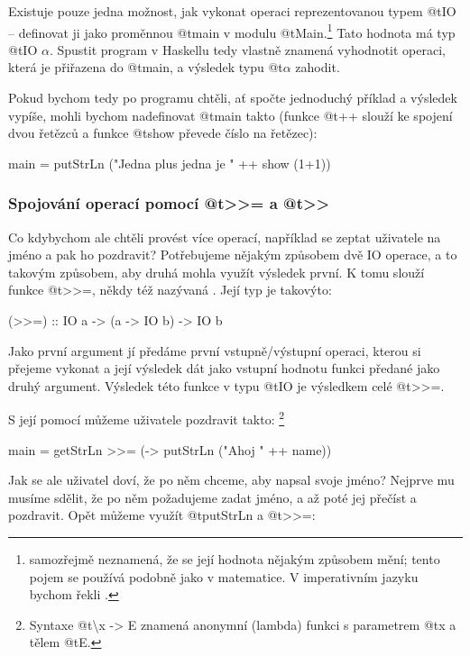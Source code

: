 Existuje pouze jedna možnost, jak vykonat operaci reprezentovanou typem @t{IO}
-- definovat ji jako proměnnou @t{main} v modulu
@t{Main}.\footnote{ samozřejmě neznamená, že se její hodnota
  nějakým způsobem mění; tento pojem se používá podobně jako v matematice. V
imperativním jazyku bychom řekli .} Tato hodnota má typ @t{IO
$\alpha$}. Spustit program v Haskellu tedy vlastně znamená vyhodnotit operaci,
která je přiřazena do @t{main}, a výsledek typu @t{$\alpha$} zahodit.

Pokud bychom tedy po programu chtěli, ať spočte jednoduchý příklad a výsledek
vypíše, mohli bychom nadefinovat @t{main} takto (funkce @t{++} slouží ke spojení
dvou řetězců a funkce @t{show} převede číslo na řetězec):

\begin{haskell}
main = putStrLn ("Jedna plus jedna je " ++ show (1+1))
\end{haskell}

\subsubsection{\texorpdfstring
  {Spojování operací pomocí @t{>>=} a @t{>>}}
  {Spojování operací pomocí >>= a >>}}

Co kdybychom ale chtěli provést více operací, například se zeptat uživatele na
jméno a pak ho pozdravit? Potřebujeme nějakým způsobem  dvě IO
operace, a to takovým způsobem, aby druhá mohla využít výsledek první. K tomu
slouží funkce @t{>>=}, někdy též nazývaná . Její typ je takovýto:

\begin{haskell}
(>>=) :: IO a -> (a -> IO b) -> IO b
\end{haskell}

Jako první argument jí předáme první vstupně/výstupní operaci, kterou si přejeme
vykonat a její výsledek dát jako vstupní hodnotu funkci předané jako druhý
argument. Výsledek této funkce  v typu @t{IO} je výsledkem celé
@t{>>=}.

S její pomocí můžeme uživatele pozdravit takto: \footnote{Syntaxe
@t{\textbackslash x -> E} znamená anonymní (lambda) funkci s parametrem @t{x} a
tělem @t{E}.}

\begin{haskell}
main = getStrLn >>= (\name -> putStrLn ("Ahoj " ++ name))
\end{haskell}
  
Jak se ale uživatel doví, že po něm chceme, aby napsal svoje jméno? Nejprve mu
musíme sdělit, že po něm požadujeme zadat jméno, a až poté jej přečíst a
pozdravit. Opět můžeme využít @t{putStrLn} a @t{>>=}:

